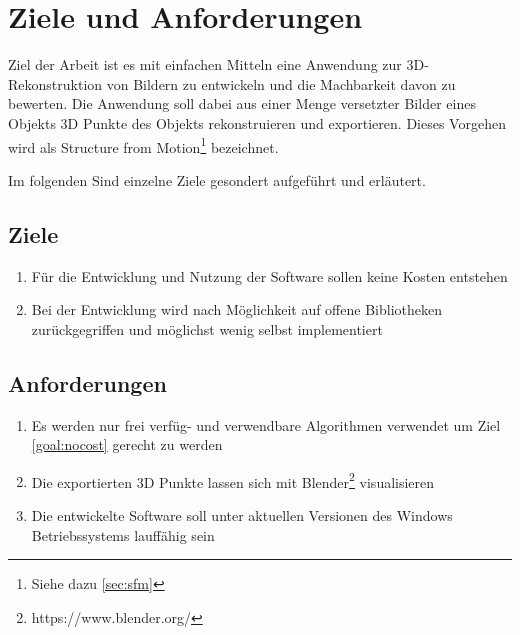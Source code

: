 
\chapter{Ziele und Anforderungen}\label{sec:goals}
Ziel der Arbeit ist es mit einfachen Mitteln eine Anwendung zur 3D-Rekonstruktion von Bildern zu entwickeln und die Machbarkeit davon zu bewerten.
Die Anwendung soll dabei aus einer Menge versetzter Bilder eines Objekts 3D Punkte des Objekts rekonstruieren und exportieren.
Dieses Vorgehen wird als Structure from Motion\footnote{Siehe dazu \autoref{sec:sfm} } bezeichnet.

Im folgenden Sind einzelne Ziele gesondert aufgeführt und erläutert.

\section{Ziele}
\begin{enumerate}
\item \label{goal:nocost} Für die Entwicklung und Nutzung der Software sollen keine Kosten entstehen
\item Bei der Entwicklung wird nach Möglichkeit auf offene Bibliotheken zurückgegriffen und möglichst wenig selbst implementiert
\end{enumerate}


\section{Anforderungen}
\begin{enumerate}
\item Es werden nur frei verfüg- und verwendbare Algorithmen verwendet um Ziel \autoref{goal:nocost} gerecht zu werden
\item  Die exportierten 3D Punkte lassen sich mit Blender\footnote{https://www.blender.org/} visualisieren
\item Die entwickelte Software soll unter aktuellen Versionen des Windows Betriebssystems lauffähig sein
\end{enumerate}
